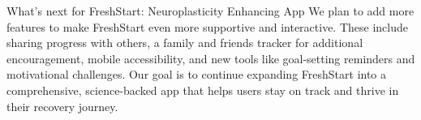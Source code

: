 What's next for FreshStart: Neuroplasticity Enhancing App
We plan to add more features to make FreshStart even more supportive and interactive. These include sharing progress with others, a family and friends tracker for additional encouragement, mobile accessibility, and new tools like goal-setting reminders and motivational challenges. Our goal is to continue expanding FreshStart into a comprehensive, science-backed app that helps users stay on track and thrive in their recovery journey.

